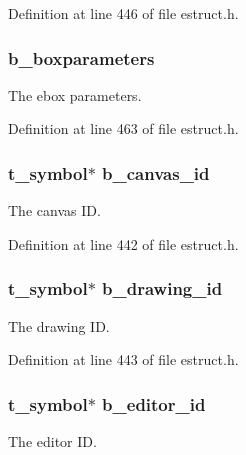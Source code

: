 Definition at line 446 of file estruct.\-h.

\hypertarget{struct__ebox_a01fa53a36dc717c81755d805a868ad9d}{
\subsubsection[{b\-\_\-boxparameters}]{ b\-\_\-boxparameters}}\label{struct__ebox_a01fa53a36dc717c81755d805a868ad9d}
The ebox parameters. 

Definition at line 463 of file estruct.\-h.

\hypertarget{struct__ebox_ac0251c6969a1032f8f50d076e909fb3e}{
\subsubsection[{b\-\_\-canvas\-\_\-id}]{\setlength{\rightskip}{0pt plus 5cm}t\-\_\-symbol$\ast$ b\-\_\-canvas\-\_\-id}}\label{struct__ebox_ac0251c6969a1032f8f50d076e909fb3e}
The canvas I\-D. 

Definition at line 442 of file estruct.\-h.

\hypertarget{struct__ebox_a153f9c9929d722ecb29217f3fb0914c9}{
\subsubsection[{b\-\_\-drawing\-\_\-id}]{\setlength{\rightskip}{0pt plus 5cm}t\-\_\-symbol$\ast$ b\-\_\-drawing\-\_\-id}}\label{struct__ebox_a153f9c9929d722ecb29217f3fb0914c9}
The drawing I\-D. 

Definition at line 443 of file estruct.\-h.

\hypertarget{struct__ebox_adf8c80c6ea45ad810c754984d98830ff}{
\subsubsection[{b\-\_\-editor\-\_\-id}]{\setlength{\rightskip}{0pt plus 5cm}t\-\_\-symbol$\ast$ b\-\_\-editor\-\_\-id}}\label{struct__ebox_adf8c80c6ea45ad810c754984d98830ff}
The editor I\-D. 

